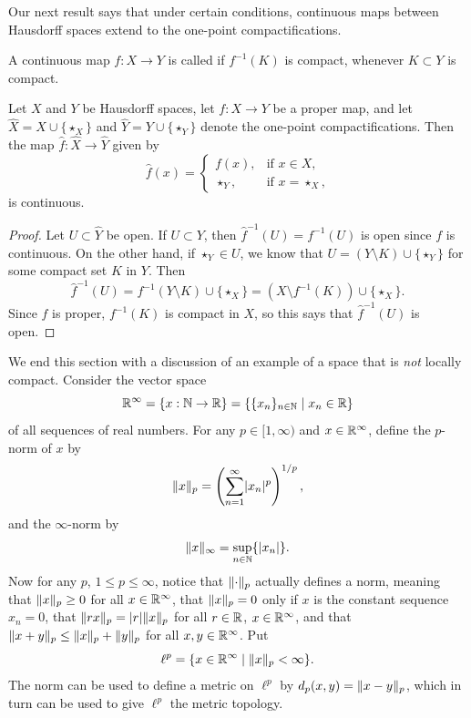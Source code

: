 Our next result says that under certain conditions, continuous maps between Hausdorff spaces extend to the one-point compactifications.

\begin{defn}
  A continuous map $f : X \to Y$ is called  if $f^{-1}(K)$ is compact, whenever $K \subset Y$ is compact.
\end{defn}
\begin{prop}
  Let $X$ and $Y$ be Hausdorff spaces, let $f : X \to Y$ be a proper map, and let $\hat{X} = X \cup \{\star_X\}$ and $\hat{Y} = Y \cup \{\star_Y\}$ denote the one-point compactifications. Then the map $\hat{f} : \hat{X} \to \hat{Y}$ given by
  \[
    \hat{f}(x) = \begin{cases} f(x),& \text{if $x \in X$,} \\ \star_Y,&\text{if $x = \star_X$,} \end{cases}
  \]
  is continuous.
\end{prop}
\begin{proof}
  Let $U \subset \hat{Y}$ be open. If $U \subset Y$, then $\hat{f}^{-1}(U) = f^{-1}(U)$ is open since $f$ is continuous. On the other hand, if $\star_Y \in U$, we know that $U = (Y \setminus K) \cup \{\star_Y\}$ for some compact set $K$ in $Y$. Then
  \[
    \hat{f}^{-1}(U) = f^{-1}(Y \setminus K) \cup \{\star_X\} = (X \setminus f^{-1}(K)) \cup \{\star_X\}.
  \]
  Since $f$ is proper, $f^{-1}(K)$ is compact in $X$, so this says that $\hat{f}^{-1}(U)$ is open.
\end{proof}

We end this section with a discussion of an example of a space that is \emph{not} locally compact. Consider the vector space
\[
  \mathbb{R}^\infty = \{ x : \mathbb{N} \to \mathbb{R} \} = \{\{x_n\}_{n \in \mathbb{N}} \mid x_n \in \mathbb{R}\}
\]
of all sequences of real numbers. For any $p \in [1,\infty)$ and $x \in \mathbb{R}^\infty$, define the $p$-norm of $x$ by
\[
  \lVert x \rVert_p = \left( \sum_{n = 1}^\infty \lvert x_n \rvert^p \right)^{1/p},
\]
and the $\infty$-norm by
\[
  \lVert x \rVert_\infty = \sup_{n \in \mathbb{N}} \{\lvert x_n \rvert\}.
\]
Now for any $p$, $1 \leq p \leq \infty$, notice that $\lVert \cdot \rVert_p$ actually defines a norm, meaning that $\lVert x \rVert_p \geq 0$ for all $x \in \mathbb{R}^\infty$, that $\lVert x \rVert_p = 0$ only if $x$ is the constant sequence $x_n = 0$, that $\lVert r x \rVert_p = \lvert r \rvert \lVert x \rVert_p$ for all $r \in \mathbb{R}$, $x \in \mathbb{R}^\infty$, and that $\lVert x+y \rVert_p \leq \lVert x \rVert_p + \lVert y \rVert_p$ for all $x, y \in \mathbb{R}^\infty$. Put
\[
  \ell^p = \{ x \in \mathbb{R}^\infty \mid \lVert x \rVert_p < \infty \}.
\]
The norm can be used to define a metric on $\ell^p$ by $d_p(x,y) = \lVert x-y \rVert_p$, which in turn can be used to give $\ell^p$ the metric topology.

